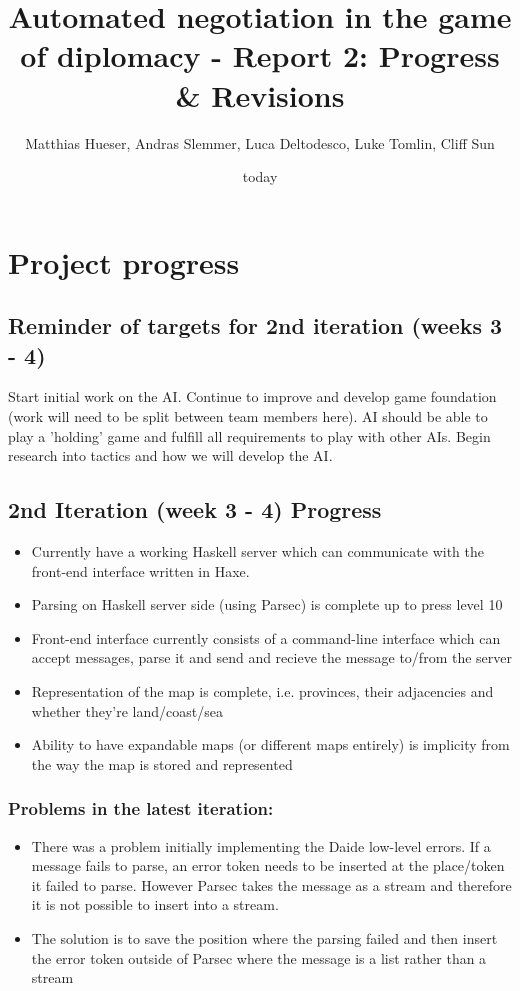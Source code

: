 \documentclass[12pt]{article}
\title{Automated negotiation in the game of diplomacy - Report 2: Progress \& Revisions}
\author{Matthias Hueser, Andras Slemmer, Luca Deltodesco, Luke Tomlin, Cliff Sun}
\date{today}
\begin{document}
\maketitle

\section{Project progress}

\subsection{Reminder of targets for 2nd iteration (weeks 3 - 4)}

Start initial work on the AI. Continue to improve and develop game
foundation (work will need to be split between team members here).
AI should be able to play a 'holding' game and fulfill all requirements
to play with other AIs. Begin research into tactics and how we will
develop the AI.

\subsection{2nd Iteration (week 3 - 4) Progress}
\begin{itemize}
\item Currently have a working Haskell server which can communicate with
the front-end interface written in Haxe. 
\item Parsing on Haskell server side (using Parsec) is complete up to press
level 10 
\item Front-end interface currently consists of a command-line interface
which can accept messages, parse it and send and recieve the message
to/from the server
\item Representation of the map is complete, i.e. provinces, their adjacencies
and whether they're land/coast/sea
\item Ability to have expandable maps (or different maps entirely) is implicity
from the way the map is stored and represented
\end{itemize}

\subsubsection{Problems in the latest iteration:}
\begin{itemize}
\item There was a problem initially implementing the Daide low-level errors.
If a message fails to parse, an error token needs to be inserted at
the place/token it failed to parse. However Parsec takes the message
as a stream and therefore it is not possible to insert into a stream. 
\item The solution is to save the position where the parsing failed and
then insert the error token outside of Parsec where the message is
a list rather than a stream
\end{itemize}
\end{document}
